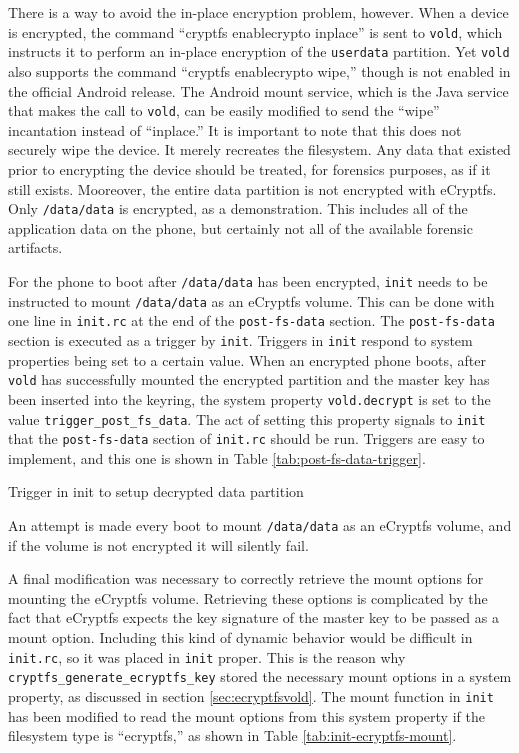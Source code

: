 There is a way to avoid the in-place encryption problem, however. When a device is encrypted, the command ``cryptfs enablecrypto
inplace'' is sent to \texttt{vold}, which instructs it to perform an in-place encryption of the \texttt{userdata} partition. Yet
\texttt{vold} also supports the command ``cryptfs enablecrypto wipe,'' though is not enabled in the official Android release. The
Android mount service, which is the Java service that makes the call to \texttt{vold}, can be easily modified to send the ``wipe''
incantation instead of ``inplace.'' It is important to note that this does not securely wipe the device. It merely recreates the
filesystem. Any data that existed prior to encrypting the device should be treated, for forensics purposes, as if it still exists.
Mooreover, the entire data partition is not encrypted with eCryptfs. Only \texttt{/data/data} is encrypted, as a demonstration. This
includes all of the application data on the phone, but certainly not all of the available forensic artifacts.

For the phone to boot after \texttt{/data/data} has been encrypted, \texttt{init} needs to be instructed to mount
\texttt{/data/data} as an eCryptfs volume. This can be done with one line in \texttt{init.rc} at the end of the
\texttt{post-fs-data} section. The \texttt{post-fs-data} section is executed as a trigger by \texttt{init}. Triggers in
\texttt{init} respond to system properties being set to a certain value. When an encrypted phone boots, after \texttt{vold} has
successfully mounted the encrypted partition and the master key has been inserted into the keyring, the system property
\texttt{vold.decrypt} is set to the value \texttt{trigger\_post\_fs\_data}. The act of setting this property signals to
\texttt{init} that the \texttt{post-fs-data} section of \texttt{init.rc} should be run. Triggers are easy to implement, and this one
is shown in Table \ref{tab:post-fs-data-trigger}.  
\begin{table}[htb] 
 
\caption{Trigger in init to setup decrypted data partition}
\label{tab:post-fs-data-trigger} 
\end{table} 
An attempt is made every boot to mount
\texttt{/data/data} as an eCryptfs volume, and if the volume is not encrypted it will silently fail. 

A final modification was necessary to correctly retrieve the mount options for mounting the eCryptfs volume. Retrieving these
options is complicated by the fact that eCryptfs expects the key signature of the master key to be passed as a mount option.
Including this kind of dynamic behavior would be difficult in \texttt{init.rc}, so it was placed in \texttt{init} proper. This is
the reason why \texttt{cryptfs\_generate\_ecryptfs\_key} stored the necessary mount options in a system property, as discussed in
section \ref{sec:ecryptfsvold}. The mount function in \texttt{init} has been modified to read the mount options from this system
property if the filesystem type is ``ecryptfs,'' as shown in Table \ref{tab:init-ecryptfs-mount}.

